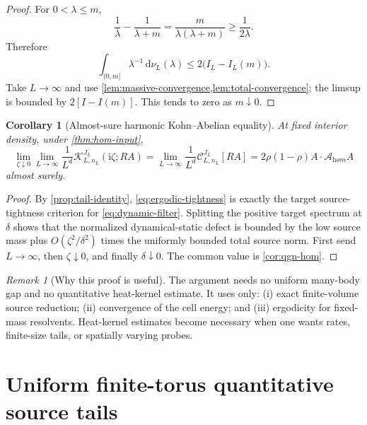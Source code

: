 \documentclass[11pt]{article}
\newtheorem{corollary}[theorem]{Corollary}
\theoremstyle{definition}
\theoremstyle{remark}
\newtheorem{remark}[theorem]{Remark}
\newcommand{\I}{\mathrm i}
\newcommand{\cC}{\mathcal C}
\newcommand{\cK}{\mathcal K}
\newcommand{\cA}{\mathcal A}
\newcommand{\dd}{\,\mathrm d}
\begin{document}
\begin{proof}
For $0<\lambda\le m$,
\begin{equation}
 \frac1\lambda-\frac1{\lambda+m}
 =\frac{m}{\lambda(\lambda+m)}\ge\frac1{2\lambda}.
\end{equation}
Therefore
\begin{equation}
 \int_{(0,m]}\lambda^{-1}\dd\nu_L(\lambda)
 \le2\bigl(I_L-I_L(m)\bigr).
 \label{eq:tail-massive-bound}
\end{equation}
Take $L\to\infty$ and use \cref{lem:massive-convergence,lem:total-convergence}; the limsup is bounded by $2[I-I(m)]$.  This tends to zero as $m\downarrow0$.
\end{proof}

\begin{corollary}[Almost-sure harmonic Kohn--Abelian equality]
\label{cor:ergodic-dynamic}
At fixed interior density, under \cref{thm:hom-input},
\begin{equation}
 \boxed{
 \lim_{\zeta\downarrow0}\lim_{L\to\infty}
 \frac1{L^d}\cK_{L,n_L}^{J_L}(\I\zeta;RA)
 =\lim_{L\to\infty}\frac1{L^d}\cC_{L,n_L}^{J_L}[RA]
 =2\rho(1-\rho)A\cdot\cA_{\mathrm hom}A}
 \label{eq:ergodic-Kohn-Abelian}
\end{equation}
almost surely.
\end{corollary}

\begin{proof}
By \cref{prop:tail-identity}, \eqref{eq:ergodic-tightness} is exactly the target source-tightness criterion for \eqref{eq:dynamic-filter}.  Splitting the positive target spectrum at $\delta$ shows that the normalized dynamical-static defect is bounded by the low source mass plus $O(\zeta^2/\delta^2)$ times the uniformly bounded total source norm.  First send $L\to\infty$, then $\zeta\downarrow0$, and finally $\delta\downarrow0$.  The common value is \cref{cor:qgn-hom}.
\end{proof}

\begin{remark}[Why this proof is useful]
The argument needs no uniform many-body gap and no quantitative heat-kernel estimate.  It uses only: (i) exact finite-volume source reduction; (ii) convergence of the cell energy; and (iii) ergodicity for fixed-mass resolvents.  Heat-kernel estimates become necessary when one wants rates, finite-size tails, or spatially varying probes.
\end{remark}

\section{Uniform finite-torus quantitative source tails}
\label{sec:heat-kernel}
\end{document}
